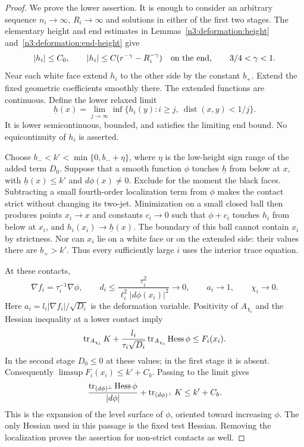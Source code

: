 \begin{proof}
We prove the lower assertion.  It is enough to consider an arbitrary
sequence $n_i\to\infty$, $R_i\to\infty$ and solutions in either of the
first two stages.  The elementary height and end estimates in
Lemmas~\ref{n3:deformation:height} and~\ref{n3:deformation:end-height} give
\begin{equation}
 |h_i|\le C_0,\qquad
 |h_i|\le C(r^{-\gamma}-R_i^{-\gamma})\quad\hbox{on the end},
 \qquad 3/4<\gamma<1.
 \label{n3:apriori:elementary-height}
\end{equation}
Near each white face extend $h_i$ to the other side by the constant
$b_+$.  Extend the fixed geometric coefficients smoothly there.
The extended functions are continuous.  Define the lower relaxed limit
\[
 \underline h(x)=\lim_{j\to\infty}
       \inf\{h_i(y):i\ge j,\ \operatorname{dist}(x,y)<1/j\}.
\]
It is lower semicontinuous, bounded, and satisfies the limiting end
bound.  No equicontinuity of $h_i$ is asserted.

Choose $b_-<k'<\min\{0,b_-+\eta\}$, where $\eta$ is the low-height
sign range of the added term $D_0$.  Suppose that a smooth function
$\phi$ touches $\underline h$ from below at $x$, with
$\underline h(x)\le k'$ and $d\phi(x)\ne0$.  Exclude for the moment
the black faces.  Subtracting a small fourth-order localization term
from $\phi$ makes the contact strict without changing its two-jet.
Minimization on a small closed ball then produces points $x_i\to x$
and constants $c_i\to0$ such that $\phi+c_i$ touches $h_i$ from below
at $x_i$, and $h_i(x_i)\to\underline h(x)$.  The boundary of this
ball cannot contain $x_i$ by strictness.  Nor can $x_i$ lie on a white
face or on the extended side: their values there are $b_+>k'$.
Thus every sufficiently large $i$ uses the interior trace equation.

At these contacts,
\[
 \nabla f_i=\tau_i^{-1}\nabla\phi,
 \qquad
 d_i\le\frac{\tau_i^2}{\ell_i^2|d\phi(x_i)|^2}
          \longrightarrow0,
 \qquad a_i\longrightarrow1,
 \qquad \chi_i\longrightarrow0.
\]
Here $a_i=l_i|\nabla f_i|/\sqrt{D_i}$ is the deformation variable.
Positivity of $A_{\chi_i}$ and the Hessian
inequality at a lower contact imply
\[
 \operatorname{tr}_{A_{\chi_i}}K+
 \frac{l_i}{\tau_i\sqrt{D_i}}
                 \operatorname{tr}_{A_{\chi_i}}\operatorname{Hess}\phi
 \le F_i(x_i).
\]
In the second stage $D_0\le0$ at these values; in the first stage it
is absent.  Consequently $\limsup F_i(x_i)\le k'+C_b$.
Passing to the limit gives
\begin{equation}
 \frac{\operatorname{tr}_{(d\phi)^\perp}\operatorname{Hess}\phi}{|d\phi|}
           +\operatorname{tr}_{(d\phi)^\perp}K\le k'+C_b.
 \label{n3:apriori:relaxed-test}
\end{equation}
This is the expansion of the level surface of $\phi$, oriented toward
increasing $\phi$.  The only Hessian used in this passage is the
fixed test Hessian.  Removing the localization proves the assertion
for non-strict contacts as well.


\end{proof}
